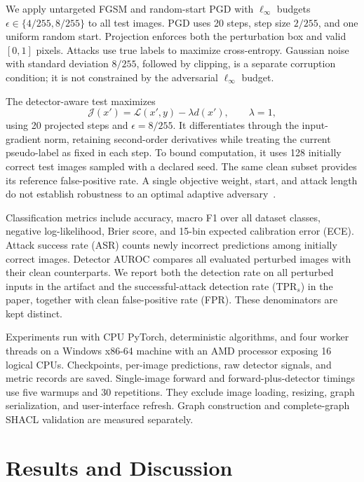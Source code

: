 \documentclass{svproc}
\begin{document}
We apply untargeted FGSM and random-start PGD with $\ell_{\infty}$ budgets $\epsilon\in\{4/255,8/255\}$ to all test images. PGD uses 20 steps, step size $2/255$, and one uniform random start. Projection enforces both the perturbation box and valid $[0,1]$ pixels. Attacks use true labels to maximize cross-entropy. Gaussian noise with standard deviation $8/255$, followed by clipping, is a separate corruption condition; it is not constrained by the adversarial $\ell_{\infty}$ budget.

The detector-aware test maximizes
\begin{equation}
 \mathcal{J}(x')=\mathcal{L}(x',y)-\lambda d(x'),\qquad\lambda=1,
 \label{eq:adaptive}
\end{equation}
using 20 projected steps and $\epsilon=8/255$. It differentiates through the input-gradient norm, retaining second-order derivatives while treating the current pseudo-label as fixed in each step. To bound computation, it uses 128 initially correct test images sampled with a declared seed. The same clean subset provides its reference false-positive rate. A single objective weight, start, and attack length do not establish robustness to an optimal adaptive adversary~\cite{carlini2017}.

Classification metrics include accuracy, macro F1 over all dataset classes, negative log-likelihood, Brier score, and 15-bin expected calibration error (ECE). Attack success rate (ASR) counts newly incorrect predictions among initially correct images. Detector AUROC compares all evaluated perturbed images with their clean counterparts. We report both the detection rate on all perturbed inputs in the artifact and the successful-attack detection rate (TPR$_s$) in the paper, together with clean false-positive rate (FPR). These denominators are kept distinct.

Experiments run with CPU PyTorch, deterministic algorithms, and four worker threads on a Windows x86-64 machine with an AMD processor exposing 16 logical CPUs. Checkpoints, per-image predictions, raw detector signals, and metric records are saved. Single-image forward and forward-plus-detector timings use five warmups and 30 repetitions. They exclude image loading, resizing, graph serialization, and user-interface refresh. Graph construction and complete-graph SHACL validation are measured separately.

\section{Results and Discussion}
\end{document}
